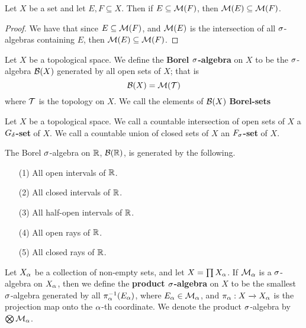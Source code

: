\begin{lemma}\label{lemma_1.1.4}
    Let $X$ be a set and let $E,F \subseteq X$. Then if $E \subseteq \mathcal{M}(F)$,
    then $\mathcal{M}(E) \subseteq \mathcal{M}(F)$.
\end{lemma}
\begin{proof}
    We have that since $E \subseteq \mathcal{M}(F)$, and $\mathcal{M}(E)$ is the intersection of
    all $\sigma$-algebras containing  $E$, then  $\mathcal{M}(E) \subseteq \mathcal{M}(F)$.
\end{proof}

\begin{definition}
    Let $X$ be a topological space. We define the  \textbf{Borel $\sigma$-algebra}
    on $X$ to be the  $\sigma$-algebra  $\mathcal{B}(X)$ generated by all open sets of $X$;
    that is
    \begin{equation*}
        \mathcal{B}(X)=\mathcal{M}(\mathcal{T})
    \end{equation*}
    where $\mathcal{T}$ is the topology on $X$. We call the elements of $\mathcal{B}(X)$
    \textbf{Borel-sets}
\end{definition}

\begin{definition}
    Let $X$ be a topological space. We call a countable intersection of open
    sets of  $X$ a \textbf{$G_\delta$-set} of $X$. We call a countable union of
    closed sets of $X$ an  \textbf{$F_\sigma$-set} of $X$.
\end{definition}

\begin{theorem}\label{theorem_1.1.5}
    The Borel $\sigma$-algebra on $\mathbb{R}$,  $\mathcal{B}(\mathbb{R})$, is generated by the following.
    \begin{enumerate}
        \item[(1)] All open intervals of $\mathbb{R}$.

        \item[(2)] All closed intervals of $\mathbb{R}$.

        \item[(3)] All half-open intervals of $\mathbb{R}$.

        \item[(4)] All open rays of $\mathbb{R}$.

        \item[(5)] All closed rays of $\mathbb{R}$.
    \end{enumerate}
\end{theorem}

\begin{definition}
    Let $X_\alpha$ be a collection of non-empty sets, and let  $X=\prod{X_\alpha}$. If
    $\mathcal{M}_\alpha$ is a $\sigma$-algebra on $X_\alpha$, then we define the \textbf{product
    $\sigma$-algebra} on $X$ to be the smallest $\sigma$-algebra generated by all
    $\pi_\alpha^{-1}(E_\alpha)$, where $E_\alpha \in \mathcal{M}_\alpha$, and $\pi_\alpha:X \xrightarrow{}
    X_\alpha$ is the projection map onto the $\alpha$-th coordinate. We denote the
    product  $\sigma$-algebra by $\bigotimes{\mathcal{M}_\alpha}$.
\end{definition}

